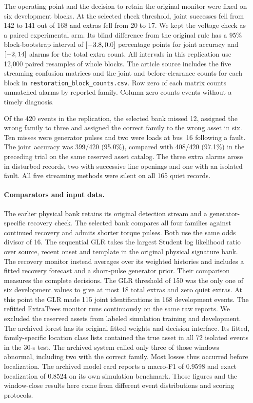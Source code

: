 The operating point and the decision to retain the original monitor
were fixed on six development blocks. At the selected check threshold,
joint successes fell from 142 to 141 out of 168 and extras fell from
20 to 17. We kept the voltage check as a paired experimental arm.
Its blind difference from the original rule has a 95\% block-bootstrap
interval of $[-3.8, 0.0]$ percentage points for joint accuracy
and $[-2, 14]$ alarms for the total extra count. All intervals
in this replication use 12,000 paired resamples of whole blocks.
The article source includes the five streaming confusion matrices
and the joint and before-clearance counts for each block in
\texttt{restoration\_block\_counts.csv}. Row zero of each matrix
counts unmatched alarms by reported family. Column zero counts
events without a timely diagnosis.



Of the 420 events in the replication, the selected bank missed 12,
assigned the wrong family to three and assigned the correct family to
the wrong asset in six. Ten misses were generator pulses and two were
loads at bus~16 following a fault. The joint accuracy was 399/420
(95.0\%), compared with 408/420 (97.1\%) in the preceding trial on the
same reserved asset catalog. The three extra alarms arose in disturbed
records, two with successive line openings and one with an isolated
fault. All five streaming methods were silent on all 165 quiet records.

\paragraph{Comparators and input data.}
The earlier physical bank retains its original detection stream and a
generator-specific recovery check. The selected bank compares all four
families against continued recovery and admits shorter torque pulses.
Both use the same odds divisor of 16. The sequential GLR takes the
largest Student log likelihood ratio
over source, recent onset and template in the original physical
signature bank. The recovery monitor instead averages over its
weighted histories and includes a fitted recovery forecast and a
short-pulse generator prior. Their comparison measures the complete
decisions. The GLR threshold of 150 was the only one of six development
values to give at most 18 total extras and zero quiet extras. At this
point the GLR made 115 joint identifications in 168 development events.
The refitted ExtraTrees monitor runs continuously on the same
raw reports. We excluded the reserved assets from labeled simulation
training and development. The archived forest has its original fitted
weights and decision interface. Its fitted, family-specific location
class lists contained the true asset in all 72 isolated events in the
30-s test. The archived system called only three of those windows
abnormal, including two with the correct family. Most losses thus
occurred before localization. The archived model card reports a
macro-F1 of 0.9598 and exact localization of 0.8524 on its own
simulation benchmark. Those figures and the window-close results here
come from different event distributions and scoring protocols.

